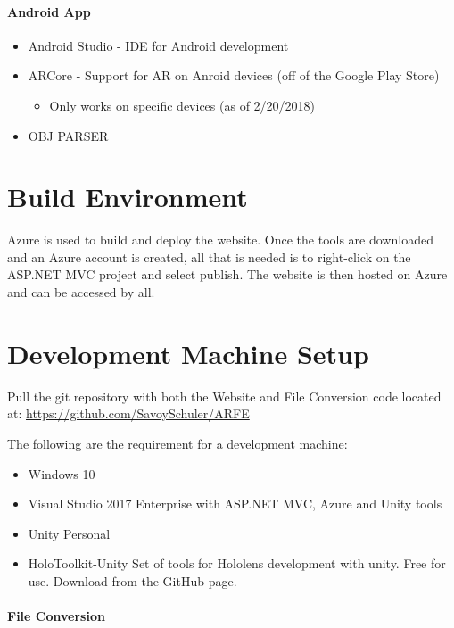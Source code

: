 \paragraph{Android App}
\begin{itemize}
    \item Android Studio - IDE for Android development
    \item ARCore - Support for AR on Anroid devices (off of the Google Play Store)
    \begin{itemize}
        \item Only works on specific devices (as of 2/20/2018)
    \end{itemize}
    \item OBJ PARSER
\end{itemize}

\section{Build  Environment}
Azure is used to build and deploy the website. Once the tools are downloaded and an Azure account is created, 
all that is needed is to right-click on the ASP.NET MVC project and select publish. The website is then hosted on Azure and
can be accessed by all.
\section{Development Machine Setup}

Pull the git repository with both the Website and File Conversion code located at: \url{https://github.com/SavoySchuler/ARFE}


The following are the requirement for a development machine:
\begin{itemize}
    \item Windows 10
    \item Visual Studio 2017 Enterprise with ASP.NET MVC, Azure and Unity tools
    \item Unity Personal
    \item HoloToolkit-Unity Set of tools for Hololens development with unity. Free for use. Download from the GitHub page.
\end{itemize}

\paragraph{File Conversion}

